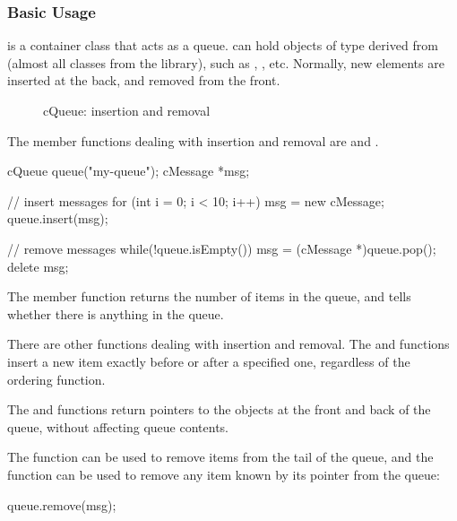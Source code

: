 \subsubsection{Basic Usage}
\label{sec:sim-lib:cqueue-basic-usage}

 is a container class that acts as a queue.
 can hold objects of type derived from 
(almost all classes from the {\opp} library), such as
, , etc. Normally, new elements
are inserted at the back, and removed from the front.

\begin{figure}[htbp]
  \begin{center}
    
    \caption{cQueue: insertion and removal}
    \label{fig:ch-sim-lib:cqueue}
  \end{center}
\end{figure}

The member functions dealing with insertion and removal are
 and .

\begin{cpp}
cQueue queue("my-queue");
cMessage *msg;

// insert messages
for (int i = 0; i < 10; i++) {
    msg = new cMessage;
    queue.insert(msg);
}

// remove messages
while(!queue.isEmpty()) {
    msg = (cMessage *)queue.pop();
    delete msg;
}
\end{cpp}

The  member function returns the number of items in the
queue, and  tells whether there is anything in the queue.

There are other functions dealing with insertion and removal.  The
 and  functions insert a
new item exactly before or after a specified one, regardless of the
ordering function.

The  and  functions return pointers to the objects
at the front and back of the queue, without affecting queue contents.

The  function can be used to remove items from the
tail of the queue, and the  function can be
used to remove any item known by its pointer from the queue:

\begin{cpp}
queue.remove(msg);
\end{cpp}


